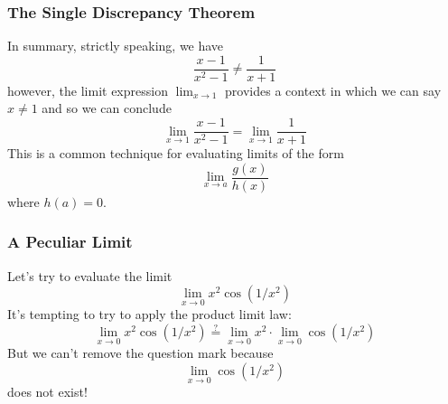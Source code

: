 \documentclass[serif,ignorenonframetext]{beamer}
\newcommand{\ds}{\displaystyle}
\begin{document}
\begin{frame}
  \frametitle{The Single Discrepancy Theorem}
  In summary, strictly speaking, we have
  \begin{displaymath}
    \frac{x-1}{x^2-1} \ne \frac{1}{x+1}
  \end{displaymath}
  \pause
  however, the limit expression $\ds\lim_{x\to 1}$ provides a context in which
  we can say $x\ne 1$
  \pause
  and so we can conclude
  \begin{displaymath}
    \lim_{x\to 1} \frac{x-1}{x^2-1}
    = \lim_{x\to 1} \frac{1}{x+1}
  \end{displaymath}
  \pause
  This is a common technique for evaluating limits of the form
  \begin{displaymath}
    \lim_{x\to a} \frac{g(x)}{h(x)}
  \end{displaymath}
  where $h(a)=0$.
\end{frame}

\begin{frame}
  \frametitle{A Peculiar Limit}
  Let's try to evaluate the limit
  \begin{displaymath}
    \lim_{x\to 0} x^2\cos(1/x^2)
  \end{displaymath}
  \pause
  It's tempting to try to apply the product limit law:
  \begin{displaymath}
    \lim_{x\to 0} x^2 \cos(1/x^2)
    \stackrel{?}{=} \lim_{x\to 0} x^2 \cdot \lim_{x\to 0} \cos(1/x^2)
  \end{displaymath}
  \pause
  But we can't remove the question mark because
  \begin{displaymath}
    \lim_{x\to 0} \cos(1/x^2)
  \end{displaymath}
  does not exist!
\end{frame}
\end{document}

